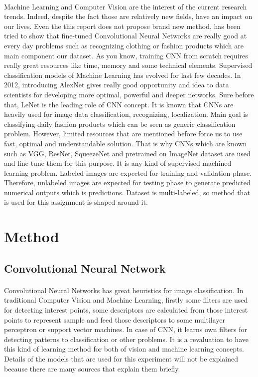 \documentclass[12pt]{article}
\begin{document}
\paragraph{} Machine Learning and Computer Vision are the interest of the current research trends. Indeed, despite the fact those are relatively new fields, have an impact on our lives. Even the this report does not propose brand new method, has been tried to show that fine-tuned Convolutional Neural Networks are really good at every day problems such as recognizing clothing or fashion products which are main component our dataset. As you know, training CNN from scratch  requires really great resources like time, memory and some technical elements. Supervised  classification models of Machine Learning has evolved for last few decades. In 2012, introducing AlexNet \cite{alexnet}  gives really good opportunity and idea to data scientists for developing more optimal, powerful and deeper networks. Sure before that, LeNet is the leading role of CNN concept. It is known that CNNs are heavily used for image data classification, recognizing, localization. Main goal is classifying daily fashion products which can be seen as generic classification problem. However, limited resources that are mentioned before force us to use fast, optimal and understandable solution. That is why CNNs which are known such as VGG\cite{vggNet}, ResNet\cite{resnet}, SqueezeNet\cite{squeezenet} and pretrained on ImageNet dataset\cite{imageNet} are used and fine-tune them for this purpose. It is any kind of supervised machined learning problem. Labeled images are expected for training and validation phase. Therefore, unlabeled images are expected for testing phase to generate predicted numerical outputs which is predictions. Dataset is multi-labeled, so method that is used for this assignment is shaped around it.            

\section{Method}

\subsection{Convolutional Neural Network}

\paragraph{} Convolutional Neural Networks has great heuristics for image classification. In traditional Computer Vision and Machine Learning, firstly some filters are used for detecting interest points, some descriptors are calculated from those interest points to represent sample and feed those descriptors to some multilayer perceptron or support vector machines. In case of CNN, it learns own filters for detecting patterns to classification or other problems. It is a revaluation to have this kind of learning method for both of vision and machine learning concepts. Details of the models that are used for this experiment will not be explained because there are many sources that explain them briefly.
\end{document}
